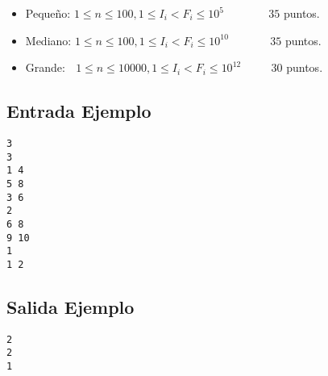 \begin{itemize}
\item Pequeño: $1 \leq n \leq 100, 1 \leq I_i< F_i \leq 10^5 $ $\quad \quad \quad \;$ $35$ puntos.
\item Mediano: $1 \leq n \leq 100, 1 \leq I_i< F_i \leq 10^{10} $ $\quad \quad \quad$ $35$ puntos.
\item Grande:  $\,\;\, 1 \leq n \leq 10000, 1 \leq I_i< F_i \leq 10^{12}  $  $\quad \quad$ $30$ puntos.
\end{itemize}

\begin{multicols}{2}
\subsection*{Entrada Ejemplo}
\begin{verbatim}
3
3
1 4
5 8
3 6
2
6 8
9 10
1
1 2
\end{verbatim}
\columnbreak
\subsection*{Salida Ejemplo}
\begin{verbatim}
2
2
1
\end{verbatim}
\end{multicols}

